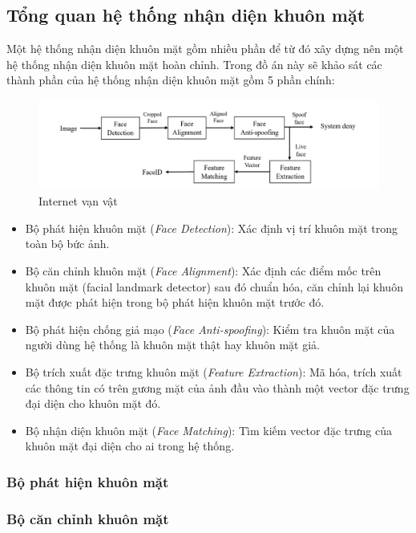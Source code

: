 \subsection*{Tổng quan hệ thống nhận diện khuôn mặt}
Một hệ thống nhận diện khuôn mặt gồm nhiều phần để từ đó xây dựng nên một hệ thống nhận diện khuôn mặt hoàn chỉnh. Trong đồ án này sẽ khảo sát các thành phần của hệ thống nhận diện khuôn mặt gồm 5 phần chính:
\begin{figure}[h]
\centering
\includegraphics[width=1.1\linewidth]{Figures/LuongMohinh}
\caption{Internet vạn vật}
\label{fig:iot}
\end{figure}
\begin{itemize}
    \item Bộ phát hiện khuôn mặt (\textit{Face Detection}): Xác định vị trí khuôn mặt trong toàn bộ bức ảnh.
    
     \item Bộ căn chỉnh khuôn mặt (\textit{Face Alignment}): Xác định các điểm mốc trên khuôn mặt (facial landmark detector) sau đó chuẩn hóa, căn chỉnh lại khuôn mặt được phát hiện trong bộ phát hiện khuôn mặt trước đó.
     
      \item Bộ phát hiện chống giả mạo (\textit{Face Anti-spoofing}): Kiểm tra khuôn mặt của người dùng hệ thống là khuôn mặt thật hay khuôn mặt giả.
       \item Bộ trích xuất đặc trưng khuôn mặt (\textit{Feature Extraction}): Mã hóa, trích xuất các thông tin có trên gương mặt của ảnh đầu vào thành một vector đặc trưng đại diện cho khuôn mặt đó.
       
        \item Bộ nhận diện khuôn mặt (\textit{Face Matching}): Tìm kiếm vector đặc trưng của khuôn mặt đại diện cho ai trong hệ thống. 
\end{itemize}
\subsubsection*{Bộ phát hiện khuôn mặt}
\subsubsection*{Bộ căn chỉnh khuôn mặt}
